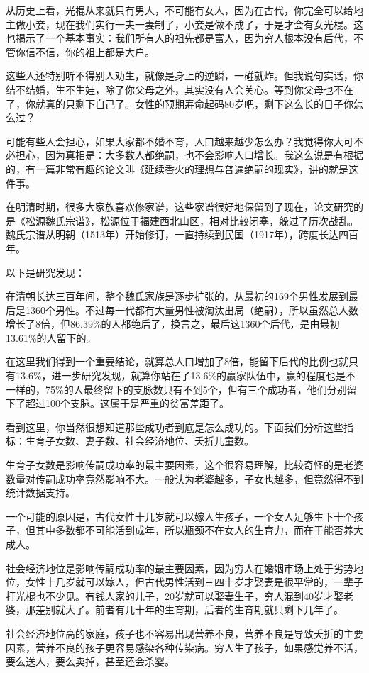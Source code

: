 \documentclass[UTF8, 11pt, oneside]{ctexart}
\begin{document}
从历史上看，光棍从来就只有男人，不可能有女人，因为在古代，你完全可以给地主做小妾，现在我们实行一夫一妻制了，小妾是做不成了，于是才会有女光棍。这也揭示了一个基本事实：我们所有人的祖先都是富人，因为穷人根本没有后代，不管你信不信，你的祖上都是大户。

这些人还特别听不得别人劝生，就像是身上的逆鳞，一碰就炸。但我说句实话，你结不结婚，生不生娃，除了你父母之外，其实没有人会关心。等到你父母也不在了，你就真的只剩下自己了。女性的预期寿命起码80岁吧，剩下这么长的日子你怎么过？

可能有些人会担心，如果大家都不婚不育，人口越来越少怎么办？我觉得你大可不必担心，因为真相是：大多数人都绝嗣，也不会影响人口增长。我这么说是有根据的，有一篇非常有趣的论文叫《延续香火的理想与普遍绝嗣的现实》，讲的就是这件事。

在明清时期，很多大家族喜欢修家谱，这些家谱很好地保留到了现在，论文研究的是《松源魏氏宗谱》，松源位于福建西北山区，相对比较闭塞，躲过了历次战乱。魏氏宗谱从明朝（1513年）开始修订，一直持续到民国（1917年），跨度长达四百年。

以下是研究发现：

在清朝长达三百年间，整个魏氏家族是逐步扩张的，从最初的169个男性发展到最后是1360个男性。不过每一代都有大量男性被淘汰出局（绝嗣），所以虽然总人数增长了8倍，但86.39\%的人都绝后了，换言之，最后这1360个后代，是由最初13.61\%的人留下的。

在这里我们得到一个重要结论，就算总人口增加了8倍，能留下后代的比例也就只有13.6\%，进一步研究发现，就算你站在了13.6\%的赢家队伍中，赢的程度也是不一样的，75\%的人最终留下的支脉数只有不到5个，但有三个成功者，他们分别留下了超过100个支脉。这属于是严重的贫富差距了。

看到这里，你当然很想知道那些成功者到底是怎么成功的。下面我们分析这些指标：生育子女数、妻子数、社会经济地位、夭折儿童数。

生育子女数是影响传嗣成功率的最主要因素，这个很容易理解，比较奇怪的是老婆数量对传嗣成功率竟然影响不大。一般认为老婆越多，子女也越多，但竟然得不到统计数据支持。

一个可能的原因是，古代女性十几岁就可以嫁人生孩子，一个女人足够生下十个孩子，但其中多数都不可能活到成年，所以瓶颈不在女人的生育力，而在于能否养大成人。

社会经济地位是影响传嗣成功率的最主要因素，因为穷人在婚姻市场上处于劣势地位，女性十几岁就可以嫁人，但古代男性活到三四十岁才娶妻是很平常的，一辈子打光棍也不少见。有钱人家的儿子，20岁就可以娶妻生子，穷人混到40岁才娶老婆，那差别就大了。前者有几十年的生育期，后者的生育期就只剩下几年了。

社会经济地位高的家庭，孩子也不容易出现营养不良，营养不良是导致夭折的主要因素，营养不良的孩子更容易感染各种传染病。穷人生了孩子，如果感觉养不活，要么送人，要么卖掉，甚至还会杀婴。
\end{document}
